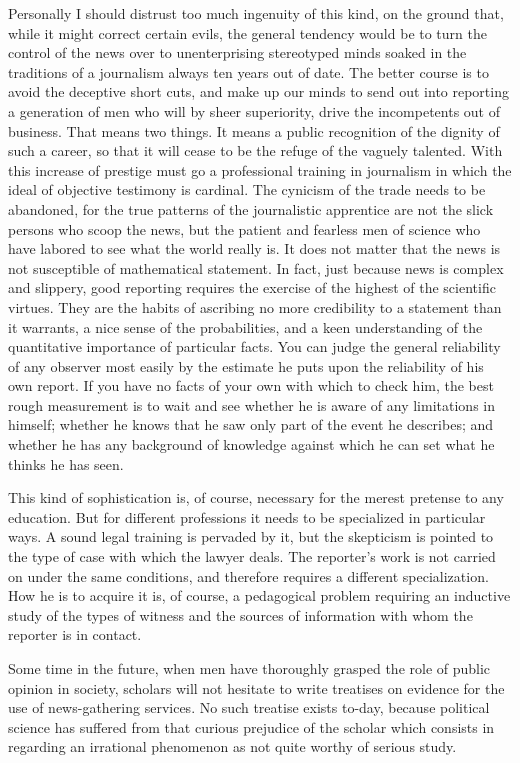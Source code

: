 \documentclass[openany,nobib,twoside,nohyper]{tufte-book}
\begin{document}
Personally I should distrust too much ingenuity of this kind, on the
ground that, while it might correct certain evils, the general tendency
would be to turn the control of the news over to unenterprising
stereotyped minds soaked in the traditions of a journalism always ten
years out of date. The better course is to avoid the deceptive short
cuts, and make up our minds to send out into reporting a generation of
men who will by sheer superiority, drive the incompetents out of
business. That means two things. It means a public recognition of the
dignity of such a career, so that it will cease to be the refuge of the
vaguely talented. With this increase of prestige must go a professional
training in journalism in which the ideal of objective testimony is
cardinal. The cynicism of the trade needs to be abandoned, for the true
patterns of the journalistic apprentice are not the slick persons who
scoop the news, but the patient and fearless men of science who have
labored to see what the world really is. It does not matter that the
news is not susceptible of mathematical statement. In fact, just because
news is complex and slippery, good reporting requires the exercise of
the highest of the scientific virtues. They are the habits of ascribing
no more credibility to a statement than it warrants, a nice sense of the
probabilities, and a keen understanding of the quantitative importance
of particular facts. You can judge the general reliability of any
observer most easily by the estimate he puts upon the reliability of his
own report. If you have no facts of your own with which to check him,
the best rough measurement is to wait and see whether he is aware of any
limitations in himself; whether he knows that he saw only part of the
event he describes; and whether he has any background of knowledge
against which he can set what he thinks he has seen.

This kind of sophistication is, of course, necessary for the merest
pretense to any education. But for different professions it needs to be
specialized in particular ways. A sound legal training is pervaded by
it, but the skepticism is pointed to the type of case with which the
lawyer deals. The reporter's work is not carried on under the same
conditions, and therefore requires a different specialization. How he is
to acquire it is, of course, a pedagogical problem requiring an
inductive study of the types of witness and the sources of information
with whom the reporter is in contact.

Some time in the future, when men have thoroughly grasped the role of
public opinion in society, scholars will not hesitate to write treatises
on evidence for the use of news-gathering services. No such treatise
exists to-day, because political science has suffered from that curious
prejudice of the scholar which consists in regarding an irrational
phenomenon as not quite worthy of serious study.
\end{document}
